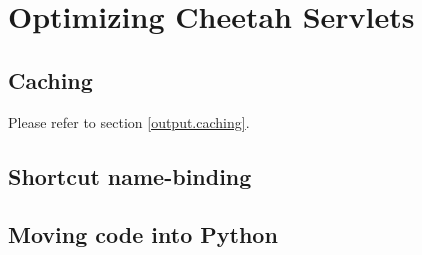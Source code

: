 \section{Optimizing Cheetah Servlets}
\label{optimizing}


\subsection{Caching}
\label{optimizing.caching}

Please refer to section \ref{output.caching}.

\subsection{Shortcut name-binding}
\label{optimizing.namebinding}

\subsection{Moving code into Python}
\label{optimizing.intoPython}




